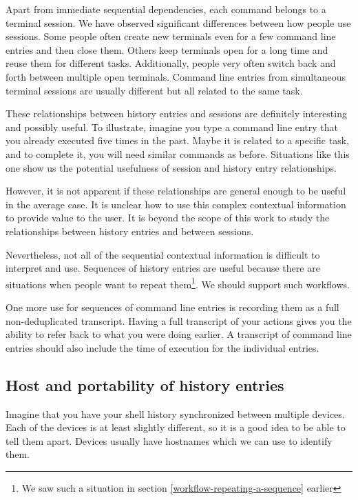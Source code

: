 Apart from immediate sequential dependencies, each command belongs to a terminal session. We have observed significant differences between how people use sessions. Some people often create new terminals even for a few command line entries and then close them. Others keep terminals open for a long time and reuse them for different tasks.
Additionally, people very often switch back and forth between multiple open terminals. Command line entries from simultaneous terminal sessions are usually different but all related to the same task.

These relationships between history entries and sessions are definitely interesting and possibly useful. To illustrate, imagine you type a command line entry that you already executed five times in the past. Maybe it is related to a specific task, and to complete it, you will need similar commands as before. Situations like this one show us the potential usefulness of session and history entry relationships.

However, it is not apparent if these relationships are general enough to be useful in the average case. It is unclear how to use this complex contextual information to provide value to the user. It is beyond the scope of this work to study the relationships between history entries and between sessions.

Nevertheless, not all of the sequential contextual information is difficult to interpret and use. Sequences of history entries are useful because there are situations when people want to repeat them\footnote{We saw such a situation in section \ref{workflow-repeating-a-sequence} earlier}. We should support such workflows.

One more use for sequences of command line entries is recording them as a full non-deduplicated transcript. Having a full transcript of your actions gives you the ability to refer back to what you were doing earlier. A transcript of command line entries should also include the time of execution for the individual entries.

\subsection{Host and portability of history entries}

Imagine that you have your shell history synchronized between multiple devices.
Each of the devices is at least slightly different, so it is a good idea to be able to tell them apart. Devices usually have hostnames which we can use to identify them. 

